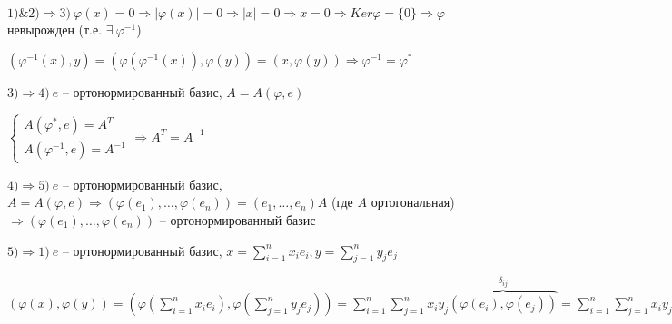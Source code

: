 \vspace{\baselineskip}
$1) \& 2) \Rightarrow 3) \ \varphi(x) = 0 \Rightarrow |\varphi(x)| = 0 \Rightarrow |x| = 0 \Rightarrow x = 0 \Rightarrow Ker \varphi = \{0\} \Rightarrow \varphi$ невырожден (т.е. $\exists \ \varphi^{-1}$)

$(\varphi^{-1}(x), y) = (\varphi(\varphi^{-1}(x)), \varphi(y)) = (x, \varphi(y)) \Rightarrow \varphi^{-1} = \varphi^*$

\vspace{\baselineskip}
$3) \Rightarrow 4) \ e$ -- ортонормированный базис, $A = A(\varphi, e)$

$\begin{cases} A(\varphi^*, e) = A^T \\ A(\varphi^{-1}, e) = A^{-1} \end{cases} \Rightarrow A^T = A^{-1}$

\vspace{\baselineskip}
$4) \Rightarrow 5) \ e$ -- ортонормированный базис, $A = A(\varphi, e) \Rightarrow (\varphi(e_1), \dots, \varphi(e_n)) = (e_1, \dots, e_n) A$ (где $A$ ортогональная) $\Rightarrow (\varphi(e_1), \dots, \varphi(e_n))$ -- ортонормированный базис

\vspace{\baselineskip}
$5) \Rightarrow 1) \ e$ -- ортонормированный базис, $x = \sum\limits_{i=1}^n x_i e_i, y = \sum\limits_{j=1}^n y_j e_j$

$(\varphi(x), \varphi(y)) = (\varphi(\sum\limits_{i=1}^n x_i e_i), \varphi(\sum\limits_{j=1}^n y_j e_j)) = \sum\limits_{i=1}^n\sum\limits_{j=1}^n x_i y_j \overbrace{(\varphi(e_i), \varphi(e_j))}^{\delta_{ij}} = \sum\limits_{i=1}^n\sum\limits_{j=1}^n x_i y_j (e_i, e_j) = (\sum\limits_{i=1}^n x_i e_i, \sum\limits_{j=1}^n y_i e_j) = (x, y) \ \lhd$

